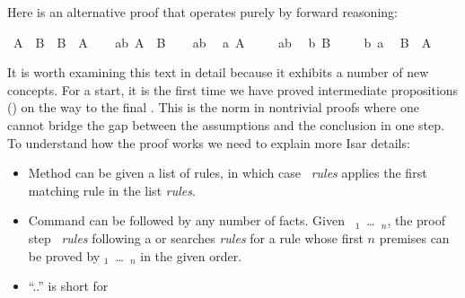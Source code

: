 \begin{isabellebody}
\begin{isamarkuptext}
Here is an alternative proof that operates purely by forward reasoning:%
\end{isamarkuptext}%
\isamarkuptrue%
\isamarkupfalse%
\ {\isachardoublequoteopen}A\ {\isasymand}\ B\ {\isasymlongrightarrow}\ B\ {\isasymand}\ A{\isachardoublequoteclose}\isanewline
%
\isadelimproof
%
\endisadelimproof
%
\isatagproof
{}\isamarkupfalse%
\isanewline
\ \ \isamarkupfalse%
\ ab{\isacharcolon}\ {\isachardoublequoteopen}A\ {\isasymand}\ B{\isachardoublequoteclose}\isanewline
\ \ \isamarkupfalse%
\ ab\ \isamarkupfalse%
\ a{\isacharcolon}\ {\isachardoublequoteopen}A{\isachardoublequoteclose}\ \isacommand{{\isachardot}{\isachardot}}\isamarkupfalse%
\isanewline
\ \ \isamarkupfalse%
\ ab\ \isamarkupfalse%
\ b{\isacharcolon}\ {\isachardoublequoteopen}B{\isachardoublequoteclose}\ \isacommand{{\isachardot}{\isachardot}}\isamarkupfalse%
\isanewline
\ \ \isamarkupfalse%
\ b\ a\ \isamarkupfalse%
\ {\isachardoublequoteopen}B\ {\isasymand}\ A{\isachardoublequoteclose}\ \isacommand{{\isachardot}{\isachardot}}\isamarkupfalse%
\isanewline
{}\isamarkupfalse%
%
\endisatagproof
{\isafoldproof}%
%
\isadelimproof
%
\endisadelimproof
%
\begin{isamarkuptext}%
\noindent It is worth examining this text in detail because it
exhibits a number of new concepts.  For a start, it is the first time
we have proved intermediate propositions () on the
way to the final . This is the norm in nontrivial
proofs where one cannot bridge the gap between the assumptions and the
conclusion in one step. To understand how the proof works we need to
explain more Isar details:
\begin{itemize}
\item
Method  can be given a list of rules, in which case
~\textit{rules}\isa{{\isacharparenright}} applies the first matching
rule in the list \textit{rules}.
\item Command  can be
followed by any number of facts.  Given ~$_1$~\dots~$_n$, the proof step
~\textit{rules}\isa{{\isacharparenright}} following a 
or  searches \textit{rules} for a rule whose first
$n$ premises can be proved by $_1$~\dots~$_n$ in the
given order.
\item ``..'' is short for

\end{itemize}
\end{isamarkuptext}
\end{isabellebody}
